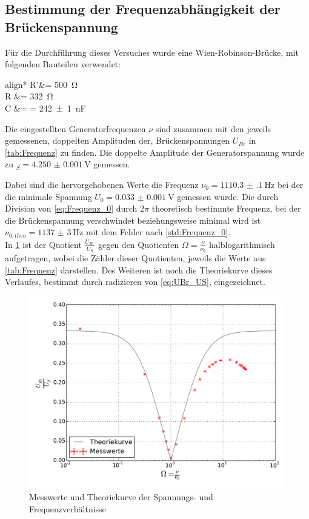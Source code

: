 \subsection{Bestimmung der Frequenzabhängigkeit der Brückenspannung}
\label{sec:Auswertung_Frequenz}
	
	Für die Durchführung dieses Versuches wurde eine Wien-Robinson-Brücke, mit folgenden Bauteilen
	verwendet:
	\begin{empheq}{align*}
			R'&= \SI{500}{\ohm}\\
			R &= \SI{332}{\ohm} \\
			C &=  \footnotemark = \SI{242(1)}{\nano\farad}
	\end{empheq}		
	
	Die eingestellten Generatorfrequenzen $\nu$ sind zusammen mit den jeweils gemessenen, doppelten Amplituden der, 
	Brückenspannungen $U_{Br}$ in \cref{tab:Frequenz} zu finden. Die doppelte Amplitude der Generatorspannung wurde zu
	$_{S} = \SI{4.250(1)}{\volt}$ gemessen. 
	
	
	
	Dabei sind die hervorgehobenen Werte die Frequenz $\nu_{0} = \SI{1110.3(1)}{\hertz}$ bei der die minimale Spannung
	$U_{0} = \SI{0.033(1)}{\volt}$ gemessen wurde. Die durch Division von \cref{eq:Frequenz_0} durch $2\pi$ theoretisch 
	bestimmte Frequenz, bei der die 
	Brückenspannung verschwindet beziehungsweise minimal wird ist $\nu_{0,theo} = \SI{1137(3)}{\hertz}$ mit dem Fehler nach \cref{std:Frequenz_0}.\\     
	
	In \cref{fig:WienRobinson} ist der Quotient $\frac{U_{Br}}{U_{S}}$ gegen 
	den Quotienten  $\Omega = \frac{\nu}{\nu_{0}}$ halblogarithmisch aufgetragen, wobei die Zähler dieser Quotienten,
	jeweils die Werte aus \cref{tab:Frequenz} darstellen. Des Weiteren ist noch die Theoriekurve dieses Verlaufes, bestimmt durch radizieren von \cref{eq:UBr_US}, eingezeichnet.  
		
	\begin{figure}[!h]
		\centering
		\includegraphics[scale=0.75]{Grafiken/WienRobinson.pdf}
		\caption{Messwerte und Theoriekurve der Spannungs- und Frequenzverhältnisse}
		\label{fig:WienRobinson}
	\end{figure}

